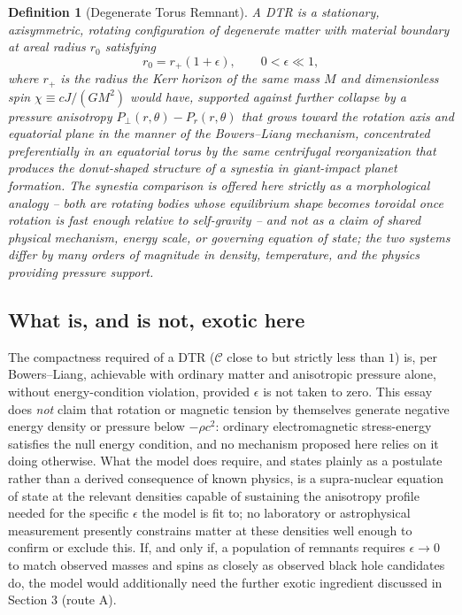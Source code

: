 \documentclass[11pt]{article}
\newtheorem{definition}{Definition}
\begin{document}
\begin{definition}[Degenerate Torus Remnant]
A DTR is a stationary, axisymmetric, rotating configuration of degenerate matter with material boundary at areal radius $r_0$ satisfying
\begin{equation}
r_0 = r_+(1+\epsilon), \qquad 0 < \epsilon \ll 1,
\end{equation}
where $r_+$ is the radius the Kerr horizon of the same mass $M$ and dimensionless spin $\chi \equiv cJ/(GM^2)$ would have, supported against further collapse by a pressure anisotropy $P_\perp(r,\theta) - P_r(r,\theta)$ that grows toward the rotation axis and equatorial plane in the manner of the Bowers--Liang mechanism, concentrated preferentially in an equatorial torus by the same centrifugal reorganization that produces the donut-shaped structure of a synestia \cite{lockstewart2017} in giant-impact planet formation. The synestia comparison is offered here strictly as a \emph{morphological} analogy -- both are rotating bodies whose equilibrium shape becomes toroidal once rotation is fast enough relative to self-gravity -- and not as a claim of shared physical mechanism, energy scale, or governing equation of state; the two systems differ by many orders of magnitude in density, temperature, and the physics providing pressure support.
\end{definition}

\subsection{What is, and is not, exotic here}

The compactness required of a DTR ($\mathcal{C}$ close to but strictly less than $1$) is, per Bowers--Liang, achievable with ordinary matter and anisotropic pressure alone, without energy-condition violation, provided $\epsilon$ is not taken to zero. This essay does \emph{not} claim that rotation or magnetic tension by themselves generate negative energy density or pressure below $-\rho c^2$: ordinary electromagnetic stress-energy satisfies the null energy condition, and no mechanism proposed here relies on it doing otherwise. What the model does require, and states plainly as a postulate rather than a derived consequence of known physics, is a supra-nuclear equation of state at the relevant densities capable of sustaining the anisotropy profile needed for the specific $\epsilon$ the model is fit to; no laboratory or astrophysical measurement presently constrains matter at these densities well enough to confirm or exclude this. If, and only if, a population of remnants requires $\epsilon \to 0$ to match observed masses and spins as closely as observed black hole candidates do, the model would additionally need the further exotic ingredient discussed in Section 3 (route A).
\end{document}
